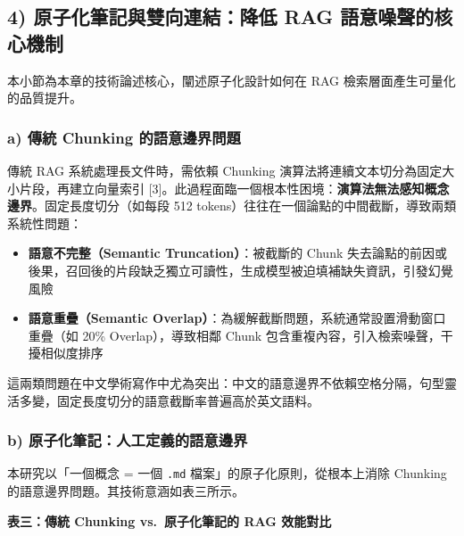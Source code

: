 \subsection{4) 原子化筆記與雙向連結：降低 RAG
語意噪聲的核心機制}\label{ux539fux5b50ux5316ux7b46ux8a18ux8207ux96d9ux5411ux9023ux7d50ux964dux4f4e-rag-ux8a9eux610fux566aux8072ux7684ux6838ux5fc3ux6a5fux5236}

本小節為本章的技術論述核心，闡述原子化設計如何在 RAG
檢索層面產生可量化的品質提升。

\subsubsection{a) 傳統 Chunking
的語意邊界問題}\label{a-ux50b3ux7d71-chunking-ux7684ux8a9eux610fux908aux754cux554fux984c}

傳統 RAG 系統處理長文件時，需依賴 Chunking
演算法將連續文本切分為固定大小片段，再建立向量索引
{[}3{]}。此過程面臨一個根本性困境：\textbf{演算法無法感知概念邊界}。固定長度切分（如每段
512 tokens）往往在一個論點的中間截斷，導致兩類系統性問題：

\begin{itemize}
\tightlist
\item
  \textbf{語意不完整（Semantic Truncation）}：被截斷的 Chunk
  失去論點的前因或後果，召回後的片段缺乏獨立可讀性，生成模型被迫填補缺失資訊，引發幻覺風險
\item
  \textbf{語意重疊（Semantic
  Overlap）}：為緩解截斷問題，系統通常設置滑動窗口重疊（如 20\%
  Overlap），導致相鄰 Chunk 包含重複內容，引入檢索噪聲，干擾相似度排序
\end{itemize}

這兩類問題在中文學術寫作中尤為突出：中文的語意邊界不依賴空格分隔，句型靈活多變，固定長度切分的語意截斷率普遍高於英文語料。

\subsubsection{b)
原子化筆記：人工定義的語意邊界}\label{b-ux539fux5b50ux5316ux7b46ux8a18ux4ebaux5de5ux5b9aux7fa9ux7684ux8a9eux610fux908aux754c}

本研究以「一個概念 = 一個 \texttt{.md} 檔案」的原子化原則，從根本上消除
Chunking 的語意邊界問題。其技術意涵如表三所示。

\textbf{表三：傳統 Chunking vs.~原子化筆記的 RAG 效能對比}

